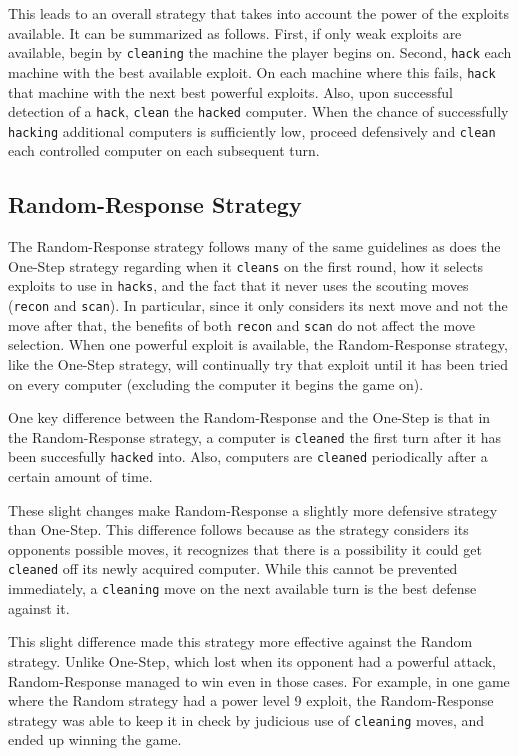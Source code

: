 \documentclass{sig-alternate-05-2015}
\begin{document}
This leads to an overall strategy that takes into account the power of the exploits available. 
It can be summarized as follows. 
First, if only weak exploits are available, begin by {\tt cleaning} the machine the player begins on.  
Second, {\tt hack} each machine with the best available exploit. 
On each machine where this fails, {\tt hack} that machine with the next best powerful exploits. 
Also, upon successful detection of a {\tt hack}, {\tt clean} the {\tt hacked} computer.
When the chance of successfully {\tt hacking} additional computers is sufficiently low, proceed defensively and {\tt clean} each controlled computer on each subsequent turn.




\subsection{Random-Response Strategy}
The Random-Response strategy follows many of the same guidelines as does the One-Step strategy regarding when it {\tt cleans} on the first round, how it selects exploits to use in {\tt hacks}, and the fact that it never uses the scouting moves ({\tt recon} and {\tt scan}).
In particular, since it only considers its next move and not the move after that, the benefits of both {\tt recon} and {\tt scan} do not affect the move selection.
When one powerful exploit is available, the Random-Response strategy, like the One-Step strategy, will continually try that exploit until it has been tried on every computer (excluding the computer it begins the game on). 

One key difference between the Random-Response and the One-Step is that in the Random-Response strategy, a computer is {\tt cleaned} the first turn after it has been succesfully {\tt hacked} into. 
Also, computers are {\tt cleaned} periodically after a certain amount of time. 

These slight changes make Random-Response a slightly more defensive strategy than One-Step.
This difference follows because as the strategy considers its opponents possible moves, it recognizes that there is a possibility it could get {\tt cleaned} off its newly acquired computer.
While this cannot be prevented immediately, a {\tt cleaning} move on the next available turn is the best defense against it.

This slight difference made this strategy more effective against the Random strategy.
Unlike One-Step, which lost when its opponent had a powerful attack, Random-Response managed to win even in those cases.
For example, in one game where the Random strategy had a power level 9 exploit, the Random-Response strategy was able to keep it in check by judicious use of {\tt cleaning} moves, and ended up winning the game.
\end{document}
